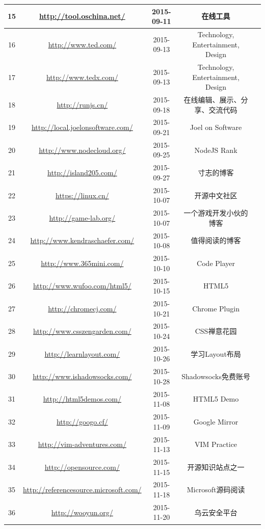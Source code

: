 \documentclass{book}
\begin{document}
\begin{longtable}{|c|c|c|c|c|}
	\hline
	15 & \url{http://tool.oschina.net/} & 2015-09-11 & 在线工具\\
	\hline
	16 & \url{http://www.ted.com/} & 2015-09-13 & Technology, Entertainment, Design\\
	\hline
	17 & \url{http://www.tedx.com/} & 2015-09-13 & Technology, Entertainment, Design\\
	\hline
	18 & \url{http://runjs.cn/} & 2015-09-18 & 在线编辑、展示、分享、交流代码\\
	\hline
	19 & \url{http://local.joelonsoftware.com/} & 2015-09-21 & Joel on Software\\
	\hline
	20 & \url{http://www.nodecloud.org/} & 2015-09-25 & NodeJS Rank\\
	\hline
	21 & \url{http://island205.com/} & 2015-09-27 & 寸志的博客\\
	\hline
	22 & \url{https://linux.cn/} & 2015-10-07 & 开源中文社区\\
	\hline
	23 & \url{http://game-lab.org/} & 2015-10-07 & 一个游戏开发小伙的博客\\
	\hline
	24 & \url{http://www.kendraschaefer.com/} & 2015-10-08 & 值得阅读的博客\\
	\hline
	25 & \url{http://www.365mini.com/} & 2015-10-10 & Code Player\\
	\hline
	26 & \url{http://www.wufoo.com/html5/} & 2015-10-15 & HTML5\\
	\hline
	27 & \url{http://chromecj.com/} & 2015-10-21 & Chrome Plugin\\
	\hline
	28 & \url{http://www.csszengarden.com/} & 2015-10-24 & CSS禅意花园\\
	\hline
	29 & \url{http://learnlayout.com/} & 2015-10-26 & 学习Layout布局\\
	\hline
	30 & \url{http://www.ishadowsocks.com/} & 2015-10-28 & Shadowsocks免费账号\\
	\hline
	31 & \url{http://html5demos.com/} & 2015-11-08 & HTML5 Demo\\
	\hline
	32 & \url{http://googo.cf/} & 2015-11-09 & Google Mirror\\
	\hline
	33 & \url{http://vim-adventures.com/} & 2015-11-13 & VIM Practice\\
	\hline
	34 & \url{http://opensource.com/} &  2015-11-15 & 开源知识站点之一\\
	\hline
	35 & \url{http://referencesource.microsoft.com/} & 2015-11-18 & Microsoft源码阅读\\
	\hline
	36 & \url{http://wooyun.org/} & 2015-11-20 & 乌云安全平台\\
	\hline

\end{longtable}
\end{document}
